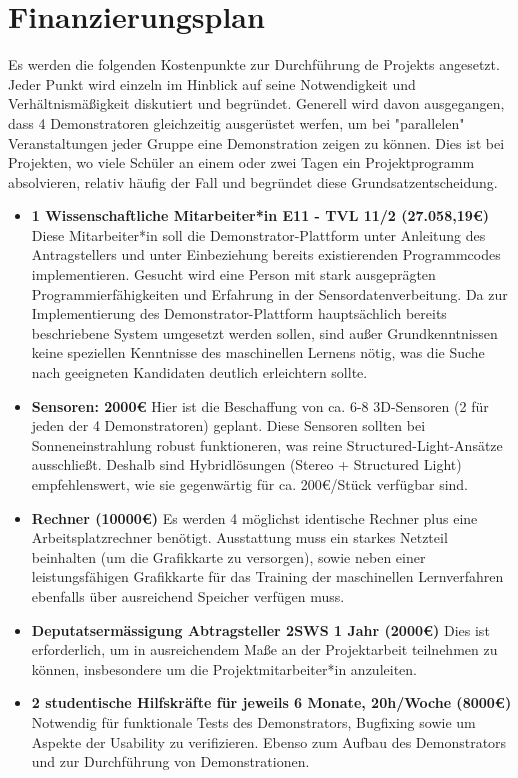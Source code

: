 \documentclass{article}
\begin{document}
\section{Finanzierungsplan}
Es werden die folgenden Kostenpunkte zur Durchführung de Projekts angesetzt. Jeder Punkt wird einzeln im Hinblick auf seine Notwendigkeit und Verhältnismäßigkeit 
diskutiert und begründet. Generell wird davon ausgegangen, dass 4 Demonstratoren gleichzeitig ausgerüstet werfen, um bei "parallelen" Veranstaltungen jeder Gruppe eine Demonstration zeigen zu können. Dies ist bei Projekten, wo viele Schüler an einem oder zwei Tagen ein Projektprogramm absolvieren, relativ häufig der Fall und begründet diese Grundsatzentscheidung.
\begin{itemize}
\item \textbf{1 Wissenschaftliche Mitarbeiter*in E11 - TVL 11/2 (27.058,19\euro)} Diese Mitarbeiter*in soll die Demonstrator-Plattform unter Anleitung des Antragstellers und unter Einbeziehung bereits existierenden Programmcodes implementieren. Gesucht wird eine Person mit stark ausgeprägten Programmierfähigkeiten und Erfahrung in der Sensordatenverbeitung. Da 
zur Implementierung des Demonstrator-Plattform hauptsächlich bereits beschriebene System umgesetzt werden sollen, sind außer Grundkenntnissen keine speziellen Kenntnisse des maschinellen Lernens nötig, was die Suche nach geeigneten Kandidaten deutlich erleichtern sollte.
\item \textbf{Sensoren: 2000\euro} Hier ist die Beschaffung von ca. 6-8 3D-Sensoren (2 für jeden der 4 Demonstratoren) geplant. Diese Sensoren sollten bei Sonneneinstrahlung robust funktioneren, was reine Structured-Light-Ansätze ausschließt. Deshalb sind Hybridlösungen (Stereo + Structured Light) empfehlenswert, wie sie gegenwärtig für ca. 200\euro/Stück verfügbar sind.
\item \textbf{Rechner (10000\euro)} Es werden 4 möglichst identische Rechner plus eine Arbeitsplatzrechner benötigt. Ausstattung muss ein starkes Netzteil beinhalten (um die Grafikkarte zu versorgen), sowie neben einer leistungsfähigen Grafikkarte für das Training der maschinellen Lernverfahren ebenfalls über ausreichend Speicher verfügen muss. 
\item \textbf{Deputatsermässigung Abtragsteller 2SWS 1 Jahr (2000\euro)} Dies ist erforderlich, um in ausreichendem Maße an der Projektarbeit teilnehmen zu können, insbesondere um die Projektmitarbeiter*in anzuleiten.
\item \textbf{2 studentische Hilfskräfte für jeweils 6 Monate, 20h/Woche (8000\euro)} Notwendig für funktionale Tests des Demonstrators, Bugfixing sowie um Aspekte der Usability zu verifizieren. Ebenso zum Aufbau des Demonstrators und zur Durchführung von Demonstrationen.
\end{itemize}




%
\end{document}
